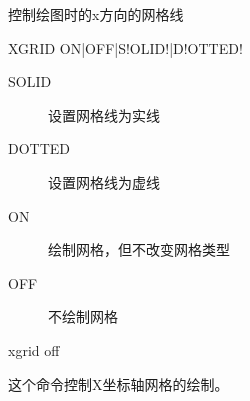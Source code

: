\label{cmd:xgrid}

控制绘图时的x方向的网格线

\begin{SACSTX}
XGRID ON|OFF|S!OLID!|D!OTTED!
\end{SACSTX}

\begin{description}
\item [SOLID] 设置网格线为实线
\item [DOTTED] 设置网格线为虚线
\item [ON] 绘制网格，但不改变网格类型
\item [OFF] 不绘制网格
\end{description}

\begin{SACDFT}
xgrid off
\end{SACDFT}

这个命令控制X坐标轴网格的绘制。
